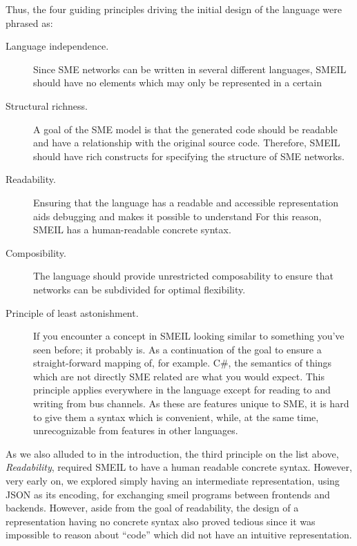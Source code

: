 Thus, the four guiding principles driving the initial design of the language
were phrased as:
\begin{description}
\item[Language independence.] Since SME networks can be written in several
  different languages, SMEIL should have no elements which may only be
  represented in a certain
\item[Structural richness.] A goal of the SME model is that the generated code
  should be readable and have a relationship with the original source
  code. Therefore, SMEIL should have rich constructs for specifying the
  structure of SME networks.
\item[Readability.] Ensuring that the language has a readable and accessible
  representation aids debugging and makes it possible to understand For this
  reason, SMEIL has a human-readable concrete syntax.
\item[Composibility.] The language should provide unrestricted composability to
  ensure that networks can be subdivided for optimal flexibility.
\item[Principle of least astonishment.] If you encounter a concept in SMEIL
  looking similar to something you've seen before; it probably is. As a
  continuation of the goal to ensure a straight-forward mapping of, for
  example. C\#, the semantics of things which are not directly SME related are
  what you would expect. This principle applies everywhere in the language
  except for reading to and writing from bus channels. As these are features
  unique to SME, it is hard to give them a syntax which is convenient, while, at
  the same time, unrecognizable from features in other languages.
\end{description}

As we also alluded to in the introduction, the third principle on the list
above, {\itshape Readability}, required SMEIL to have a human readable concrete
syntax. However, very early on, we explored simply having an intermediate
representation, using JSON as its encoding, for exchanging \gls{smeil} programs
between frontends and backends. However, aside from the goal of readability, the
design of a representation having no concrete syntax also proved tedious since
it was impossible to reason about ``code'' which did not have an intuitive
representation.

